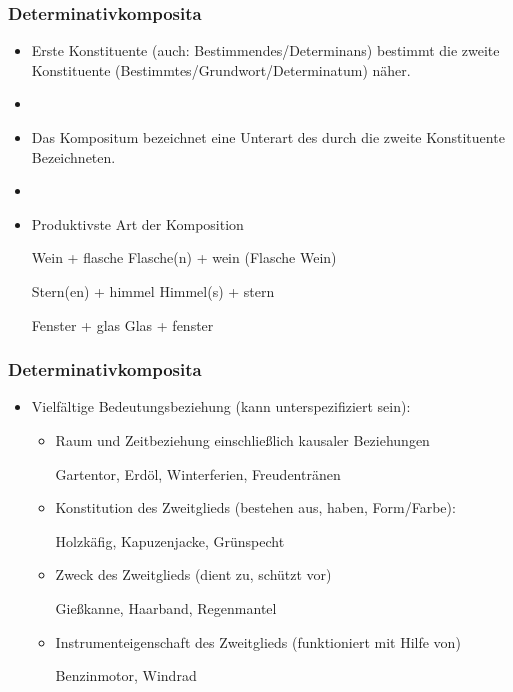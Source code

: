 

\begin{frame}
\frametitle{Determinativkomposita}

\begin{itemize}
	\item Erste Konstituente (auch: Bestimmendes/Determinans) bestimmt die zweite Konstituente (Bestimmtes/Grundwort/Determinatum) näher.
	\item[]
	\item Das Kompositum bezeichnet eine Unterart des durch die zweite Konstituente Bezeichneten.
	\item[]
	\item Produktivste Art der Komposition
	
	\ea Wein + flasche \vs Flasche(n) + wein (Flasche \vs Wein)
	\z
	
	\ea Stern(en) + himmel \vs Himmel(s) + stern
	\z
		
	\ea Fenster + glas \vs Glas + fenster
	\z
	
\end{itemize}

\end{frame}


\begin{frame}
\frametitle{Determinativkomposita}

\begin{itemize}
	\item Vielfältige Bedeutungsbeziehung (kann unterspezifiziert sein):
		\begin{itemize}
		
			\item Raum und Zeitbeziehung einschließlich kausaler Beziehungen
			
			\ea Gartentor, Erdöl, Winterferien, Freudentränen
			\z
			
			\item Konstitution des Zweitglieds (bestehen aus, haben, Form/Farbe):
			
			\ea Holzkäfig, Kapuzenjacke, Grünspecht
			\z
			
			\item Zweck des Zweitglieds (dient zu, schützt vor)
			
			\ea Gießkanne, Haarband, Regenmantel
			\z
			
			\item Instrumenteigenschaft des Zweitglieds (funktioniert mit Hilfe von)
			
			\ea Benzinmotor, Windrad
			\z
			
		\end{itemize}
	
\end{itemize}

\end{frame}

